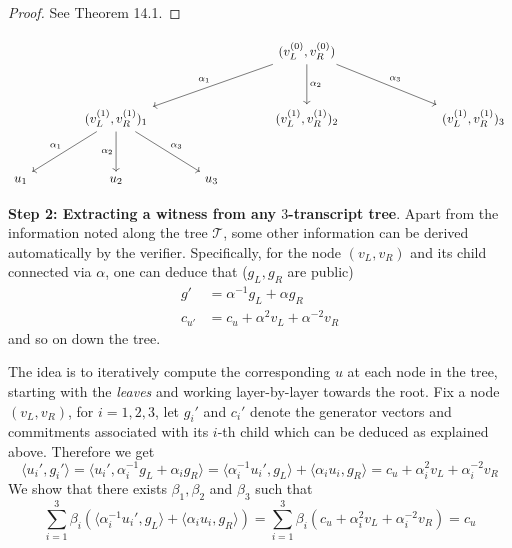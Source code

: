 \documentclass{article}
\begin{document}
\begin{proof}
See \cite{ThalerBookZKP} Theorem 14.1.
\end{proof}
\[\begin{tikzcd}[column sep=large,row sep=3.15em]
	&&& {(v_{L}^{(0)}, v_{R}^{(0)})} \\
	& {(v_{L}^{(1)}, v_{R}^{(1)})_{1}} && {(v_{L}^{(1)}, v_{R}^{(1)})_{2}} && {(v_{L}^{(1)}, v_{R}^{(1)})_{3}} \\
	{u_{1}} & {u_{2}} & {u_{3}}
	\arrow["{\alpha_{1}}"', from=1-4, to=2-2]
	\arrow["{\alpha_{2}}", from=1-4, to=2-4]
	\arrow["{\alpha_{3}}", from=1-4, to=2-6]
	\arrow["{\alpha_{1}}"', from=2-2, to=3-1]
	\arrow["{\alpha_{2}}"', from=2-2, to=3-2]
	\arrow["{\alpha_{3}}", from=2-2, to=3-3]
\end{tikzcd}\]

\textbf{Step 2: Extracting a witness from any $3$-transcript tree}. Apart from the information noted along the tree $\mathcal{T}$, some other information can be derived automatically by the verifier. Specifically, for the node $(v_L, v_R)$ and its child connected via $\alpha$, one can deduce that ($g_L, g_R$ are public)
\begin{equation*}
\begin{split}
g' & = \alpha^{-1} g_L + \alpha g_R \\
c_{u'} & = c_u + \alpha^2 v_L + \alpha^{-2} v_R
\end{split}
\end{equation*}
and so on down the tree. 

The idea is to iteratively compute the corresponding $u$ at each node in the tree, starting with the \textit{leaves} and working layer-by-layer towards the root. Fix a node $(v_L, v_R)$, for $i = 1, 2, 3$, let $g_i'$ and $c_i'$ denote the generator vectors and commitments associated with its $i$-th child which can be deduced as explained above. Therefore we get
\begin{equation*}
\langle u_i', g_i' \rangle = \langle u_i', \alpha_{i}^{-1} g_L + \alpha_{i} g_R \rangle = \langle \alpha_i^{-1} u_i', g_L \rangle  + \langle \alpha_{i} u_i, g_R \rangle = c_u + \alpha_i^2 v_L + \alpha_i^{-2} v_R
\end{equation*}
We show that there exists $\beta_1, \beta_2$ and $\beta_3$ such that 
\begin{equation*}
\sum_{i = 1}^3 \beta_i \left( \langle \alpha_i^{-1} u_i', g_L \rangle  + \langle \alpha_{i} u_i, g_R \rangle  \right) = \sum_{i = 1}^3 \beta_i (c_u + \alpha_i^2 v_L + \alpha_i^{-2} v_R) = c_u 
\end{equation*}
\end{document}
